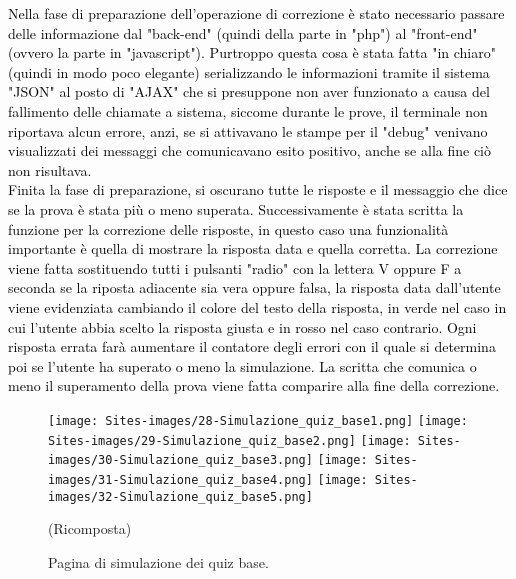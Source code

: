 \textcolor{black}{Nella fase di preparazione dell'operazione di correzione è stato necessario passare delle informazione dal "back-end" (quindi della parte in "php") al "front-end" (ovvero la parte in "javascript"). Purtroppo questa cosa è stata fatta "in chiaro" (quindi in modo poco elegante) serializzando le informazioni tramite il sistema "JSON" al posto di "AJAX" che si presuppone non aver  funzionato a causa del fallimento delle chiamate a sistema, siccome durante le prove, il terminale non riportava alcun errore, anzi, se si attivavano le stampe per il "debug" venivano visualizzati dei messaggi che comunicavano esito positivo, anche se alla fine ciò non risultava.\\
Finita la fase di preparazione, si oscurano tutte le risposte e il messaggio che dice se la prova è stata più o meno superata. Successivamente è stata scritta la funzione per la correzione delle risposte, in questo caso una funzionalità importante è quella di mostrare la risposta data e quella corretta. La correzione viene fatta sostituendo tutti i pulsanti "radio" con la lettera V oppure F a seconda se la riposta adiacente sia vera oppure falsa, la risposta data dall'utente viene evidenziata cambiando il colore del testo della risposta, in verde nel caso in cui l'utente abbia scelto la risposta giusta e in rosso nel caso contrario. Ogni risposta errata farà aumentare il contatore degli errori con il quale si determina poi se l'utente ha superato o meno la simulazione. La scritta che comunica o meno il
superamento della prova viene fatta comparire alla fine della correzione.}\\

\begin{minipage}{\textwidth}
\begin{figure}[H]
	\begin{center}
		\texttt{[image: Sites-images/28-Simulazione\_quiz\_base1.png]}
		\texttt{[image: Sites-images/29-Simulazione\_quiz\_base2.png]}
		\texttt{[image: Sites-images/30-Simulazione\_quiz\_base3.png]}
		\texttt{[image: Sites-images/31-Simulazione\_quiz\_base4.png]}
		\texttt{[image: Sites-images/32-Simulazione\_quiz\_base5.png]}
		\caption{Pagina di simulazione dei quiz base.}
		(Ricomposta)
	\end{center}
\end{figure}
\end{minipage}

